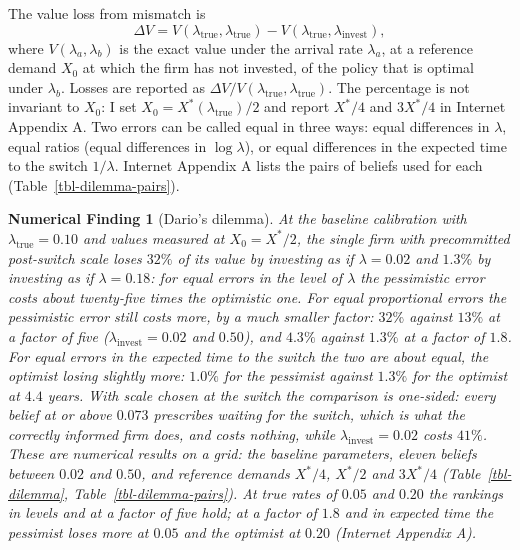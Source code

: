 \documentclass[
  11pt,
  letterpaper,
]{scrartcl}
\begin{document}
The value loss from mismatch is \[
\Delta V = V(\lambda_{\text{true}}, \lambda_{\text{true}}) - V(\lambda_{\text{true}}, \lambda_{\text{invest}}),
\] where \(V(\lambda_a, \lambda_b)\) is the exact value under the
arrival rate \(\lambda_a\), at a reference demand \(X_0\) at which the
firm has not invested, of the policy that is optimal under
\(\lambda_b\). Losses are reported as
\(\Delta V / V(\lambda_{\text{true}}, \lambda_{\text{true}})\). The
percentage is not invariant to \(X_0\): I set
\(X_0 = X^*(\lambda_{\text{true}})/2\) and report \(X^*/4\) and
\(3X^*/4\) in Internet Appendix A. Two errors can be called equal in
three ways: equal differences in \(\lambda\), equal ratios (equal
differences in \(\log \lambda\)), or equal differences in the expected
time to the switch \(1/\lambda\). Internet Appendix A lists the pairs of
beliefs used for each (Table~\ref{tbl-dilemma-pairs}).

\textbf{Numerical Finding 1} (Dario's dilemma). \emph{At the baseline
calibration with \(\lambda_{\text{true}} = 0.10\) and values measured at
\(X_0 = X^*/2\), the single firm with precommitted post-switch scale
loses \(32\%\) of its value by investing as if \(\lambda = 0.02\) and
\(1.3\%\) by investing as if \(\lambda = 0.18\): for equal errors in the
level of \(\lambda\) the pessimistic error costs about twenty-five times
the optimistic one. For equal proportional errors the pessimistic error
still costs more, by a much smaller factor: \(32\%\) against \(13\%\) at
a factor of five (\(\lambda_{\text{invest}} = 0.02\) and \(0.50\)), and
\(4.3\%\) against \(1.3\%\) at a factor of \(1.8\). For equal errors in
the expected time to the switch the two are about equal, the optimist
losing slightly more: \(1.0\%\) for the pessimist against \(1.3\%\) for
the optimist at \(4.4\) years. With scale chosen at the switch the
comparison is one-sided: every belief at or above \(0.073\) prescribes
waiting for the switch, which is what the correctly informed firm does,
and costs nothing, while \(\lambda_{\text{invest}} = 0.02\) costs
\(41\%\). These are numerical results on a grid: the baseline
parameters, eleven beliefs between \(0.02\) and \(0.50\), and reference
demands \(X^*/4\), \(X^*/2\) and \(3X^*/4\) (Table~\ref{tbl-dilemma},
Table~\ref{tbl-dilemma-pairs}). At true rates of \(0.05\) and \(0.20\)
the rankings in levels and at a factor of five hold; at a factor of
\(1.8\) and in expected time the pessimist loses more at \(0.05\) and
the optimist at \(0.20\) (Internet Appendix A).}
\end{document}
